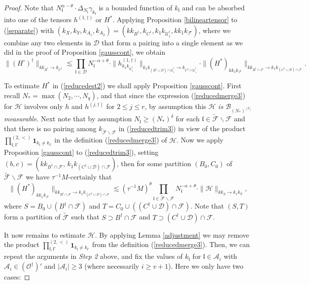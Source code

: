 \documentclass[11 pt,reqno]{amsart}
\theoremstyle{definition}
\theoremstyle{remark}
\numberwithin{equation}{section}
\newcommand{\Dc}{\mathcal{D}}
\newcommand{\Fc}{\mathcal{F}}
\newcommand{\Uc}{\mathcal{U}}
\newcommand{\Bc}{\mathcal{B}}
\newcommand{\Ac}{\mathcal{A}}
\newcommand{\Hc}{\mathcal{H}}
\newcommand{\lf}{\mathfrak{l}}
\newcommand{\Os}{\mathscr{O}}
\begin{document}
{\begin{proof}
Note that $N_\lf^{\alpha-\theta}\cdot\Delta_{N_\lf}\gamma_{k_\lf}$ is a bounded function of $k_\lf$ and can be absorbed into one of the tensors $h^{(1,\dagger)}$  or $H^*$.
Applying Proposition \ref{bilineartensor} to (\ref{separate})
 with $(k_X,k_Y,k_{A_1},k_{A_2})=(kk_{B^\dagger},k_{C^\dagger},k_1k_{\Uc^\dagger_1},kk_1k_{\Fc})$, where we combine any two elements in $\Dc$ that form a pairing into a single element as we did in the proof of Proposition \ref{gausscont}, we obtain
\begin{equation}\label{reducedest2}\|(H^\circ)^\dagger\|_{kk_{B^\dagger}\to k_{C^\dagger}}\lesssim\prod_{\lf\in\Dc}N_\lf^{-\alpha+\theta}\cdot\|h_{k_1k_{\Uc_1^\dagger}}^{(1,\dagger)}\|_{k_1k_{(B^\dagger\cup\Dc)\cap\Uc_1^\dagger}\to k_{C^\dagger\cap \Uc_1^\dagger}}\cdot\|(H^*)_{kk_1k_\Fc}\|_{kk_{B^\dagger\cap \Fc}\to k_1k_{(C^\dagger\cup\Dc)\cap\Fc}}.\end{equation}

To estimate $H^*$ in (\ref{reducedest2}) we shall apply Proposition \ref{gausscont}. First recall
 $N_*=\max(N_2,\cdots,N_q)$, and that since the expression (\ref{reducedmerge3}) for $\Hc$ involves only $h$ and $h^{(j,\dagger)}$ for $2\leq j\leq r$, by assumption this $\Hc$ \emph{is $\Bc_{(N_*)^{[\delta]}}$ measurable}. Next note that by assumption $N_\lf\geq (N_*)^\delta$ for each $\lf\in\widetilde{\Fc}\backslash\Fc$ and that there is no pairing among $k_{\widetilde{\Fc}\backslash\Fc}$ in (\ref{reducedtrim3}) in view of the product $\prod_{\lf,\lf'}^{(2,<)} \mathbf{1}_{k_\lf\neq k_{\lf'}}$ in the definition (\ref{reducedmerge3}) of $\Hc$. Now we apply Proposition \ref{gausscont} to (\ref{reducedtrim3}), setting $(b,c)=(kk_{B^\dagger\cap \Fc},\,k_1k_{(C^\dagger\cup\Dc)\cap\Fc})$, then for some partition $(B_0,C_0)$ of $\widetilde{\Fc}\backslash\Fc$ we have $\tau^{-1}M$-certainly that 
\begin{equation}\label{step3}\|(H^*)_{kk_1k_\Fc}\|_{kk_{B^\dagger\cap \Fc}\to k_1k_{(C^\dagger\cup\Dc)\cap\Fc}}\lesssim(\tau^{-1}M)^\theta\prod_{\lf\in\widetilde{\Fc}\backslash\Fc}N_\lf^{-\alpha+\theta}\cdot\|\Hc\|_{kk_S\to k_1k_T},
\end{equation}
where $S=B_0\cup (B^\dagger\cap \Fc)$ and $T=C_0\cup((C^\dagger\cup\Dc)\cap\Fc)$. Note that $(S,T)$ form a partition of $\widetilde{\Fc}$ such that $S\supset B^\dagger\cap \Fc$ and $T\supset (C^\dagger\cup\Dc)\cap\Fc$.

 

It now remains to estimate $\Hc$. By applying Lemma \ref{adjustment} we may remove the product $\prod_{\lf,\lf'}^{(2,<)} \mathbf{1}_{k_\lf\neq k_{\lf'}}$ from the definition (\ref{reducedmerge3}). Then, we can repeat the arguments in \emph{Step 2} above, and fix the values of $k_\lf$ for $\lf\in\Ac_i$ with $\Ac_i\in(\Os^\dagger)'$ and $|\Ac_i|\geq 3$ (where necessarily $i\geq v+1$). Here we only have two cases:


\end{proof}}
\end{document}
